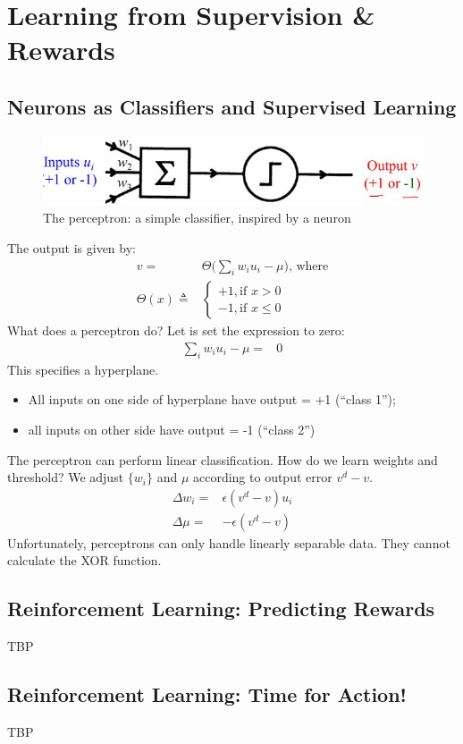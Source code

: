 \documentclass[]{article}
\begin{document}
\section{Learning from Supervision \& Rewards}\label{sec:week8}

\subsection{Neurons as Classifiers and Supervised Learning}
\begin{figure}[H]
	\begin{center}
		\caption{The perceptron: a simple classifier, inspired by a neuron}
		\includegraphics[width=\textwidth]{perceptron}
	\end{center}
\end{figure}

The output is given by:
\begin{align*}
	v =& \Theta\big(\sum_i w_i u_i - \mu\big)\text{, where}\\
	\Theta(x) \triangleq& \begin{cases}
		+1, \text{if $x>0$}\\
		-1, \text{if $x\le 0$}
	\end{cases}
\end{align*}
What does a perceptron do? Let is set the expression to zero:
\begin{align*}
	\sum_i w_i u_i - \mu=&0
\end{align*}
This specifies a hyperplane.
\begin{itemize}
	\item All inputs on one side of hyperplane have output = +1 (“class 1”);
	\item all inputs on other side have output = -1 (“class 2”)
\end{itemize}
The perceptron can perform linear classification. How do we learn weights and threshold? We adjust $\{w_i\}$ and $\mu$ according to output error $v^d-v$.
\begin{align*}
	\Delta w_i =& \epsilon(v^d-v)u_i\\
	\Delta \mu =& -\epsilon(v^d-v)
\end{align*}
Unfortunately, perceptrons can only handle linearly separable data. They cannot calculate the XOR function.

\subsection{Reinforcement Learning: Predicting Rewards}
TBP

\subsection{Reinforcement Learning: Time for Action!}
TBP

\appendix

\printglossaries




\end{document}
